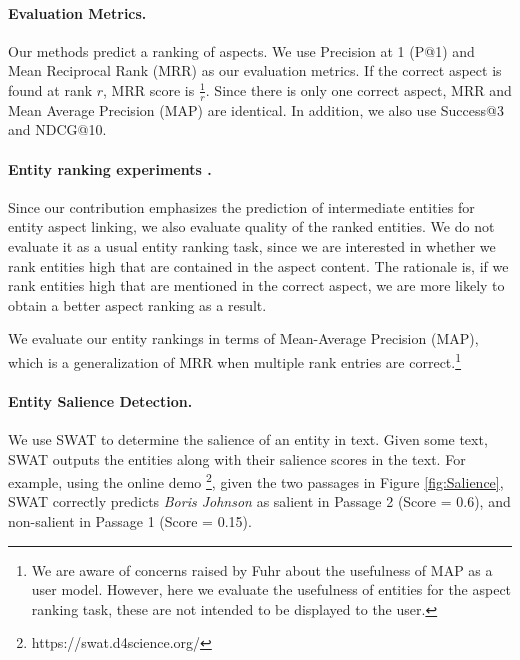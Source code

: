 \paragraph{\textbf{Evaluation Metrics.}}
Our methods predict a ranking of aspects. We use Precision at 1 (P@1) and Mean Reciprocal Rank (MRR) as our evaluation metrics. If the correct aspect is found at rank $r$, MRR score is $\frac{1}{r}$. Since there is only one correct aspect, MRR and Mean Average Precision (MAP) are identical. In addition, we also use Success@3 and NDCG@10.


\paragraph{\textbf{Entity ranking experiments .}}
Since our contribution emphasizes the prediction of intermediate entities for entity aspect linking, we also evaluate quality of the ranked entities. We do not evaluate it as a usual entity ranking task, since we are interested in whether we rank entities high that are contained in the aspect content. The rationale is, if we rank entities high that are mentioned in the correct aspect, we are more likely to obtain a better aspect ranking as a result. 

We evaluate our entity rankings in terms of Mean-Average Precision (MAP), which is a generalization of MRR when multiple rank entries are correct.\footnote{We are aware of concerns raised by Fuhr \cite{fuhr2018some} about the usefulness of MAP as a user model. However, here we evaluate the usefulness of entities for the aspect ranking task, these are not intended to be displayed to the user.}


\paragraph{\textbf{Entity Salience Detection.}}
We use SWAT \cite{swat}  to determine the salience of an entity in text. Given some text, SWAT outputs the entities along with their salience scores in the text. For example, using the online demo \footnote{https://swat.d4science.org/}, given the two passages in Figure \ref{fig:Salience}, SWAT correctly predicts \textit{Boris Johnson} as salient in Passage 2 (Score = 0.6), and non-salient in Passage 1 (Score = 0.15). 

